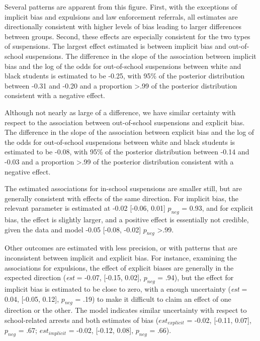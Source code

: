 \documentclass[english,floatsintext,man]{apa6}
\theoremstyle{definition}
\theoremstyle{definition}
\theoremstyle{remark}
\begin{document}
Several patterns are apparent from this figure. First, with the
exceptions of implicit bias and expulsions and law enforcement
referrals, all estimates are directionally consistent with higher levels
of bias leading to larger differences between groups. Second, these
effects are especially consistent for the two types of suspensions. The
largest effect estimated is between implicit bias and out-of-school
suspensions. The difference in the slope of the association between
implicit bias and the log of the odds for out-of-school suspensions
between white and black students is estimated to be -0.25, with 95\% of
the posterior distribution between -0.31 and -0.20 and a proportion
\textgreater{}.99 of the posterior distribution consistent with a
negative effect.

Although not nearly as large of a difference, we have similar certainty
with respect to the association between out-of-school suspensions and
explicit bias. The difference in the slope of the association between
explicit bias and the log of the odds for out-of-school suspensions
between white and black students is estimated to be -0.08, with 95\% of
the posterior distribution between -0.14 and -0.03 and a proportion
\textgreater{}.99 of the posterior distribution consistent with a
negative effect.

The estimated associations for in-school suspensions are smaller still,
but are generally consistent with effects of the same direction. For
implicit bias, the relevant parameter is estimated at -0.02 {[}-0.06,
0.01{]} \(p_{neg}\) = 0.93, and for explicit bias, the effect is
slightly larger, and a positive effect is essentially not credible,
given the data and model -0.05 {[}-0.08, -0.02{]} \(p_{neg}\)
\textgreater{}.99.

Other outcomes are estimated with less precision, or with patterns that
are inconsistent between implicit and explicit bias. For instance,
examining the associations for expulsions, the effect of explicit biases
are generally in the expected direction (\emph{est} = -0.07, {[}-0.15,
0.02{]}, \(p_{neg}\) = .94), but the effect for implicit bias is
estimated to be close to zero, with a enough uncertainty (\emph{est} =
0.04, {[}-0.05, 0.12{]}, \(p_{neg}\) = .19) to make it difficult to
claim an effect of one direction or the other. The model indicates
similar uncertainty with respect to school-related arrests and both
estimates of bias (\(est_{explicit}\) = -0.02, {[}-0.11, 0.07{]},
\(p_{neg}\) = .67; \(est_{implicit}\) = -0.02, {[}-0.12, 0.08{]},
\(p_{neg}\) = .66).
\end{document}
